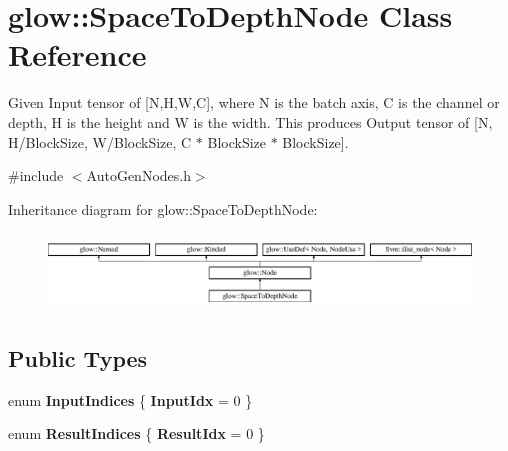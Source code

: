 \hypertarget{classglow_1_1_space_to_depth_node}{}\section{glow\+:\+:Space\+To\+Depth\+Node Class Reference}
\label{classglow_1_1_space_to_depth_node}


Given Input tensor of \mbox{[}N,H,W,C\mbox{]}, where N is the batch axis, C is the channel or depth, H is the height and W is the width. This produces Output tensor of \mbox{[}N, H/\+Block\+Size, W/\+Block\+Size, C $\ast$ Block\+Size $\ast$ Block\+Size\mbox{]}.  




{\ttfamily \#include $<$Auto\+Gen\+Nodes.\+h$>$}

Inheritance diagram for glow\+:\+:Space\+To\+Depth\+Node\+:\begin{figure}[H]
\begin{center}
\leavevmode
\includegraphics[height=2.028986cm]{classglow_1_1_space_to_depth_node}
\end{center}
\end{figure}
\subsection*{Public Types}
\begin{DoxyCompactItemize}
\item 
\mbox{\label{classglow_1_1_space_to_depth_node_a152922f99b148a1940d661413ebc8cc1}} 
enum {\bfseries Input\+Indices} \{ {\bfseries Input\+Idx} = 0
 \}
\item 
\mbox{\label{classglow_1_1_space_to_depth_node_a3306a4e78a51dc5b4a9914582e5e2098}} 
enum {\bfseries Result\+Indices} \{ {\bfseries Result\+Idx} = 0
 \}
\end{DoxyCompactItemize}
